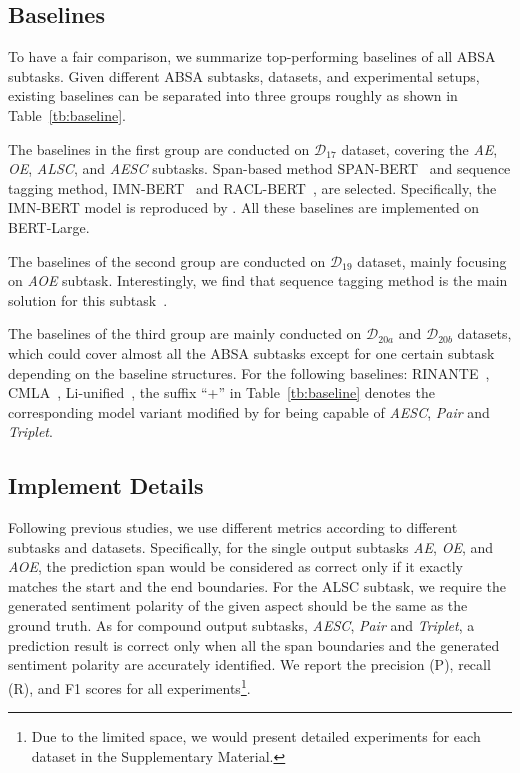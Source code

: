 \documentclass[11pt,a4paper]{article}
\begin{document}
\subsection{Baselines}
To have a fair comparison, we summarize top-performing baselines of all ABSA subtasks. Given different ABSA subtasks, datasets, and experimental setups, existing baselines can be separated into three groups roughly as shown in Table~\ref{tb:baseline}.

The baselines in the first group are conducted on \emph{$\mathcal{D}_{17}$} dataset, covering the \emph{AE}, \emph{OE}, \emph{ALSC}, and \emph{AESC}  subtasks. Span-based method SPAN-BERT~\citep{DBLP:conf/acl/HuPHLL19} and sequence tagging method, IMN-BERT~\citep{DBLP:conf/acl/HeLND19} and RACL-BERT~\citep{DBLP:conf/acl/ChenQ20}, are selected. Specifically, the IMN-BERT model is  reproduced by \citet{DBLP:conf/acl/ChenQ20}. All these baselines are implemented on BERT-Large.


The baselines of the second group are conducted on \emph{$\mathcal{D}_{19}$} dataset, mainly focusing on \emph{AOE}  subtask. Interestingly, we find that sequence tagging method is the main solution for this subtask~\citep{DBLP:conf/naacl/FanWDHC19,DBLP:conf/aaai/WuZDHC20,DBLP:conf/emnlp/VeysehNDDN20}.

The baselines of the third group are mainly conducted on \emph{$\mathcal{D}_{20a}$} and \emph{$\mathcal{D}_{20b}$} datasets, which could  cover almost all the  ABSA subtasks except for one certain subtask depending on the baseline structures.   For the following baselines: RINANTE~\citep{DBLP:conf/acl/DaiS19}, CMLA~\citep{DBLP:conf/aaai/WangPDX17}, Li-unified~\citep{DBLP:conf/aaai/LiBLL19}, the suffix ``+'' in  Table~\ref{tb:baseline}  denotes the corresponding model variant  modified by \citet{DBLP:conf/aaai/PengXBHLS20} for being capable of \emph{AESC},  \emph{Pair}  and \emph{Triplet}.









\subsection{Implement Details}
Following previous studies, we use different metrics according to different subtasks and datasets. Specifically, for the single output subtasks \emph{AE}, \emph{OE}, and \emph{AOE}, the prediction span would be considered  as correct only if it exactly matches the start and the end boundaries. For the ALSC subtask, we require the generated sentiment polarity of the given aspect should be the same as the ground truth. As for compound output subtasks, \emph{AESC}, \emph{Pair} and \emph{Triplet}, a prediction result is correct only when  all the span boundaries and the generated sentiment polarity are  accurately identified. We report the precision (P), recall (R), and F1 scores for all experiments\footnote{Due to the limited space, we would present detailed experiments for each dataset in the Supplementary Material.}.
\end{document}
